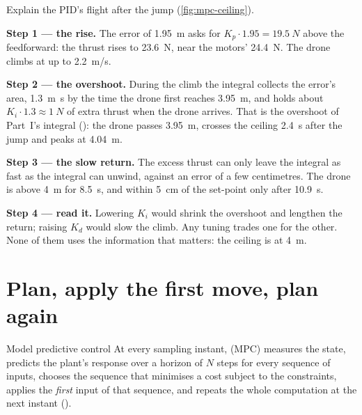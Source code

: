 \begin{example}
\label{ex:mpc-pid}
Explain the PID's flight after the jump (\cref{fig:mpc-ceiling}).

\textbf{Step 1 — the rise.} The error of \SI{1.95}{m} asks for $K_p \cdot 1.95 = \SI{19.5}{N}$ above the feedforward: the thrust rises to \SI{23.6}{N}, near the motors' \SI{24.4}{N}. The drone climbs at up to \SI{2.2}{m/s}.

\textbf{Step 2 — the overshoot.} During the climb the integral collects the error's area, \SI{1.3}{m.s} by the time the drone first reaches \SI{3.95}{m}, and holds about $K_i \cdot 1.3 \approx \SI{1}{N}$ of extra thrust when the drone arrives. That is the overshoot of Part~I's integral (): the drone passes \SI{3.95}{m}, crosses the ceiling \SI{2.4}{s} after the jump and peaks at \SI{4.04}{m}.

\textbf{Step 3 — the slow return.} The excess thrust can only leave the integral as fast as the integral can unwind, against an error of a few centimetres. The drone is above \SI{4}{m} for \SI{8.5}{s}, and within \SI{5}{cm} of the set-point only after \SI{10.9}{s}.

\textbf{Step 4 — read it.} Lowering $K_i$ would shrink the overshoot and lengthen the return; raising $K_d$ would slow the climb. Any tuning trades one for the other. None of them uses the information that matters: the ceiling is at \SI{4}{m}.
\end{example}

\section{Plan, apply the first move, plan again}

\begin{definition}{Model predictive control}
At every sampling instant,  (MPC) measures the state, predicts the plant's response over a horizon of $N$ steps for every sequence of inputs, chooses the sequence that minimises a cost subject to the constraints, applies the \emph{first} input of that sequence, and repeats the whole computation at the next instant ().
\end{definition}

